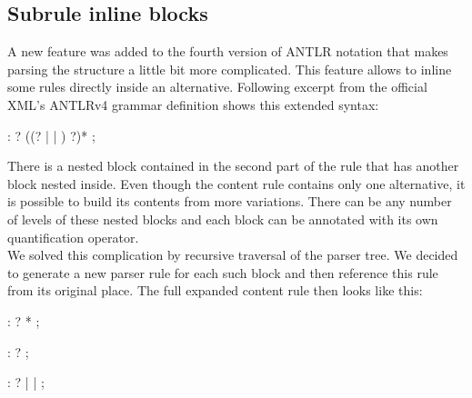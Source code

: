 \subsection{Subrule inline blocks}

A new feature was added to the fourth version of ANTLR notation that makes parsing the structure a little bit more complicated. This feature allows to inline some rules directly inside an alternative. Following excerpt from the official XML's ANTLRv4 grammar definition shows this extended syntax:

\begin{antlr}
 :   ? ((? |  | ) ?)* ;
\end{antlr}

There is a nested block contained in the second part of the rule that has another block nested inside. Even though the content rule contains only one alternative, it is possible to build its contents from more variations. There can be any number of levels of these nested blocks and each block can be annotated with its own quantification operator. 
\\

We solved this complication by recursive traversal of the parser tree. We decided to generate a new parser rule for each such block and then reference this rule from its original place. The full expanded content rule then looks like this:

\begin{antlr}
 :   ? * ;

 :    ? ;

 :   ? 
        |    
        |   
        ;
\end{antlr}